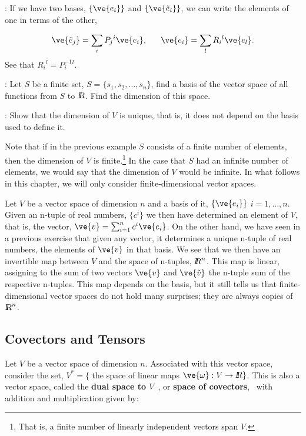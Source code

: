 \ejer: If we have two bases, $\{\ve{e_i}\}$ and $\{\ve{\tilde{e}_i}\}$, we can write the elements of one in terms of the other, 

\[
\ve{\tilde{e}_j} = \sum_i P_{j}{}^i \ve{e_i}, \;\;\;\;\;\; \ve{e_i} = \sum_l R_{i}{}^l \ve{e_l}.
\]
%
See that $R_{i}{}^l = P^{-1}_{i}{}^l $.

\ejer:
Let $S$ be a finite set, $S = \{s_1,s_2,\dots,s_n\}$, find a basis 
of the vector space of all functions from $S$ to $\mbox{\sl {l$\!\!\!\;\:\!$R}}$. 
Find the dimension of this space.

\ejer: Show that the dimension of $V$ is unique, that is, it does not depend on
the basis used to define it. 

Note that if in the previous example $S$ consists of a finite number of elements, 
then the dimension of $V$ is finite.\footnote{That is, a finite number of linearly independent vectors span $V$.} In the case that $S$
had an infinite number of elements, we would say that the dimension of $V$
would be infinite. In what follows in this chapter, we will only
consider finite-dimensional vector spaces.

Let $V$ be a vector space of dimension $n$ and a basis of it, $\{\ve{e_i}\}$ $i=1, \ldots ,n$. 
Given an n-tuple of real numbers, $\{c^{i}\}$ we then have determined an element of $V$, 
that is, the vector,  $\ve{v}=\sum_{i=1}^{n} c^{i}\ve{e_i}$. 
On the other hand, we have seen in a previous exercise that given any vector, it determines a unique n-tuple of real numbers, the elements of $\ve{v}$ in that basis. 
We see that we then have an invertible map between $V$ and the space of n-tuples, $\mbox{\sl {l$\!\!\!\;\:\!$R}}^{n}$.
This map is linear, assigning to the sum of two vectors $\ve{v}$ and $\ve{\tilde{v}}$ the n-tuple sum of the respective n-tuples. This map depends on the basis, but it still tells us that finite-dimensional vector spaces do not hold many surprises; they are always copies of $\mbox{\sl {l$\!\!\!\;\:\!$R}}^{n}$.

\subsection{Covectors and Tensors}
\label{sub:Covectors_and_Tensors}

Let $V$ be a vector space of dimension $n$. 
Associated with this vector space, consider the set,
$V^*=\{$ the space of linear maps $\ve{\omega}:V\to \re\}$. 
This is also
a vector space, called the {\bf dual space to $V$}~, 
or {\bf space of covectors},~ with addition and multiplication given by: 

